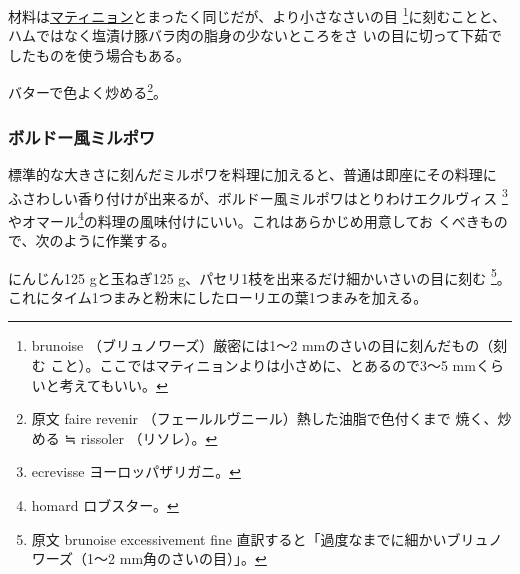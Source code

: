 \begin{recette}

 

材料は\protect\hyperlink{matignon}{マティニョン}とまったく同じだが、より小さなさいの目
\footnote{brunoise （ブリュノワーズ）厳密には1〜2
  mmのさいの目に刻んだもの（刻む
  こと）。ここではマティニョンよりは小さめに、とあるので3〜5
  mmくらいと考えてもいい。}に刻むことと、ハムではなく塩漬け豚バラ肉の脂身の少ないところをさ
いの目に切って下茹でしたものを使う場合もある。

バターで色よく炒める\footnote{原文 faire revenir
  （フェールルヴニール）熱した油脂で色付くまで 焼く、炒める ≒ rissoler
  （リソレ）。}。

\hypertarget{mirepoix-fine}{%
\subsubsection{ボルドー風ミルポワ}\label{mirepoix-fine}}



標準的な大きさに刻んだミルポワを料理に加えると、普通は即座にその料理に
ふさわしい香り付けが出来るが、ボルドー風ミルポワはとりわけエクルヴィス
\footnote{ecrevisse ヨーロッパザリガニ。}やオマール\footnote{homard
  ロブスター。}の料理の風味付けにいい。これはあらかじめ用意してお
くべきもので、次のように作業する。

にんじん125 gと玉ねぎ125 g、パセリ1枝を出来るだけ細かいさいの目に刻む
\footnote{原文 brunoise excessivement fine
  直訳すると「過度なまでに細かいブリュノワーズ（1〜2
  mm角のさいの目）」。}。これにタイム1つまみと粉末にしたローリエの葉1つまみを加える。


\end{recette}
